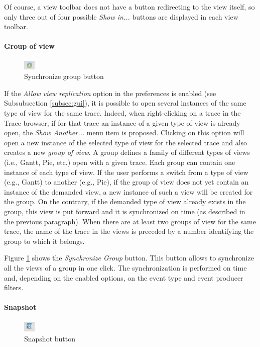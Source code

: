\documentclass[twoside]{article}
\begin{document}
\begin{sloppypar}
Of course, a view toolbar does not have a button redirecting to the view itself, so only three out of four possible \emph{Show in...} buttons are displayed in each view toolbar.

\paragraph{Group of view}
\begin{figure}[h!]
  \centering
    \includegraphics[width=0.05\textwidth]{images/synchronize_group.png}
  \caption{Synchronize group button}
  \label{fig:syncGroup}
\end{figure}

If the \emph{Allow view replication} option in the preferences is enabled (see Subsubsection \ref{subsec:gui}), it is possible to open several instances of the same type of view for the same trace. 
Indeed, when right-clicking on a trace in the Trace browser, if for that trace an instance of a given type of view is already open, the \emph{Show Another...} menu item is proposed. 
Clicking on this option will open a new instance of the selected type of view for the selected trace and also creates a new \emph{group of view}. 
A group defines a family of different types of views (i.e., Gantt, Pie, etc.) open with a given trace.
Each group can contain one instance of each type of view.
If the user performs a switch from a type of view (e.g., Gantt) to another (e.g., Pie), if the group of view does not yet contain an instance of the demanded view, a new instance of such a view will be created for the group.
On the contrary, if the demanded type of view already exists in the group, this view is put forward and it is synchronized on time (as described in the previous paragraph).  
When there are at least two groups of view for the same trace, the name of the trace in the views is preceded by a number identifying the group to which it belongs.

Figure \ref{fig:syncGroup} shows the \emph{Synchronize Group} button. This button allows to synchronize all the views of a group in one click. 
The synchronization is performed on time and, depending on the enabled options, on the event type and event producer filters.

\paragraph{Snapshot}
\begin{figure}[h!]
  \centering
    \includegraphics[width=0.05\textwidth]{images/snapshot_icon.png}
  \caption{Snapshot button}
  \label{fig:snapshot}
\end{figure}


\end{sloppypar}
\end{document}
